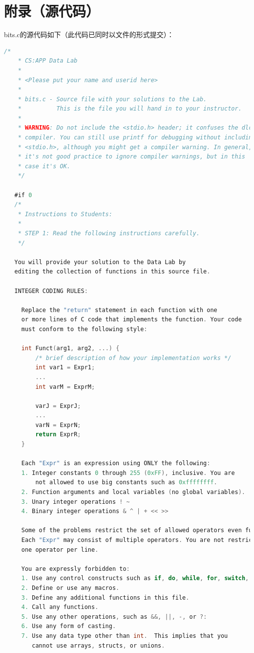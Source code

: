 \documentclass{article}
\begin{document}
\section{附录（源代码）}
\large
bits.c的源代码如下（此代码已同时以文件的形式提交）：
\begin{lstlisting}[language=C]
    /* 
    * CS:APP Data Lab 
    * 
    * <Please put your name and userid here>
    * 
    * bits.c - Source file with your solutions to the Lab.
    *          This is the file you will hand in to your instructor.
    *
    * WARNING: Do not include the <stdio.h> header; it confuses the dlc
    * compiler. You can still use printf for debugging without including
    * <stdio.h>, although you might get a compiler warning. In general,
    * it's not good practice to ignore compiler warnings, but in this
    * case it's OK.  
    */
   
   #if 0
   /*
    * Instructions to Students:
    *
    * STEP 1: Read the following instructions carefully.
    */
   
   You will provide your solution to the Data Lab by
   editing the collection of functions in this source file.
   
   INTEGER CODING RULES:
    
     Replace the "return" statement in each function with one
     or more lines of C code that implements the function. Your code 
     must conform to the following style:
    
     int Funct(arg1, arg2, ...) {
         /* brief description of how your implementation works */
         int var1 = Expr1;
         ...
         int varM = ExprM;
   
         varJ = ExprJ;
         ...
         varN = ExprN;
         return ExprR;
     }
   
     Each "Expr" is an expression using ONLY the following:
     1. Integer constants 0 through 255 (0xFF), inclusive. You are
         not allowed to use big constants such as 0xffffffff.
     2. Function arguments and local variables (no global variables).
     3. Unary integer operations ! ~
     4. Binary integer operations & ^ | + << >>
       
     Some of the problems restrict the set of allowed operators even further.
     Each "Expr" may consist of multiple operators. You are not restricted to
     one operator per line.
   
     You are expressly forbidden to:
     1. Use any control constructs such as if, do, while, for, switch, etc.
     2. Define or use any macros.
     3. Define any additional functions in this file.
     4. Call any functions.
     5. Use any other operations, such as &&, ||, -, or ?:
     6. Use any form of casting.
     7. Use any data type other than int.  This implies that you
        cannot use arrays, structs, or unions.
   

\end{lstlisting}
\end{document}
